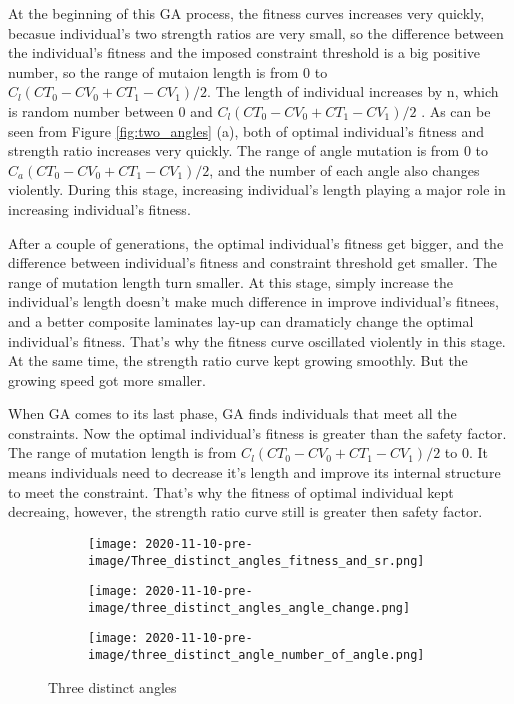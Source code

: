 At the beginning of this GA process, the fitness curves increases very quickly,
becasue individual's two strength ratios are very small, so the difference
between the individual's fitness and the imposed constraint threshold is a big
positive number, so the range of mutaion length is from 0 to $C_l(CT_0 - CV_0 +
CT_1 - CV_1)/2$.  The length of individual increases by n, which is random
number between 0 and $C_l(CT_0 - CV_0 + CT_1 - CV_1)/2$ . As can be seen from
Figure \ref{fig:two_angles} (a), both of optimal individual's fitness and
strength ratio increases very quickly.  The range of angle mutation is from 0 to
$C_a(CT_0 - CV_0 + CT_1 - CV_1)/2$, and the number of each angle also changes
violently. During this stage, increasing individual's length playing a major
role in increasing individual's fitness.

After a couple of generations, the optimal individual's fitness get bigger, and
the difference between individual's fitness and constraint threshold get
smaller. The range of mutation length turn smaller. At
this stage, simply increase the individual's length doesn't make much difference
in improve individual's fitnees, and a better composite laminates lay-up can
dramaticly change the optimal individual's fitness. That's why the fitness curve
oscillated violently in this stage.  At the same time, the strength ratio curve
kept growing smoothly. But the growing speed got more smaller.

When GA comes to its last phase, GA finds individuals that meet all the
constraints.  Now the optimal individual's fitness is greater than the safety
factor. The range of mutation length is from $C_l(CT_0 - CV_0 + CT_1 - CV_1)/2$
to 0. It means individuals need to decrease it's length and improve its internal
structure to meet the constraint. That's why the fitness of optimal individual
kept decreaing, however, the strength ratio curve still is greater then safety
factor.

\begin{figure}[!t]
	\centering
		\begin{subfigure}[b]{0.8\linewidth}
			\texttt{[image: 2020-11-10-pre-image/Three\_distinct\_angles\_fitness\_and\_sr.png]}
		\end{subfigure}

		\begin{subfigure}[b]{0.8\linewidth}
			\texttt{[image: 2020-11-10-pre-image/three\_distinct\_angles\_angle\_change.png]}
		\end{subfigure}

		\begin{subfigure}[b]{0.8\linewidth}
			\texttt{[image: 2020-11-10-pre-image/three\_distinct\_angle\_number\_of\_angle.png]}
		\end{subfigure}
	\caption{Three distinct angles}
	\label{fig:three_angles}
\end{figure}


